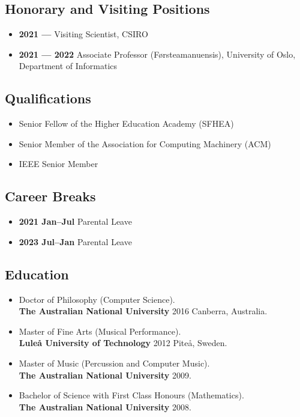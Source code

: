 \documentclass[11pt, a4paper, oneside]{article}
\begin{document}
\subsection*{Honorary and Visiting Positions}

\begin{itemize}
\item \textbf{2021 ---} Visiting Scientist, CSIRO
\item \textbf{2021 --- 2022} Associate Professor (F{\o}rsteamanuensis), University of Oslo,
  Department of Informatics
\end{itemize}

\subsection*{Qualifications}
\begin{itemize}
	\item Senior Fellow of the Higher Education Academy (SFHEA)
	\item Senior Member of the Association for Computing Machinery (ACM)
	\item IEEE Senior Member
\end{itemize}

\subsection*{Career Breaks}
\begin{itemize}
	\item \textbf{2021 Jan--Jul} Parental Leave
	\item \textbf{2023 Jul--Jan} Parental Leave
\end{itemize}

\subsection*{Education}
\label{education}

\begin{itemize}

\item Doctor of Philosophy (Computer Science).\\
  \textbf{The Australian National University} 2016 Canberra, Australia.
\item Master of Fine Arts (Musical Performance).\\
  \textbf{Lule{\aa} University of Technology} 2012 Pite{\aa}, Sweden.
\item Master of Music (Percussion and Computer Music).\\
  \textbf{The Australian National University} 2009.
\item Bachelor of Science with First Class Honours (Mathematics).\\
  \textbf{The Australian National University} 2008.
\end{itemize}
\end{document}
